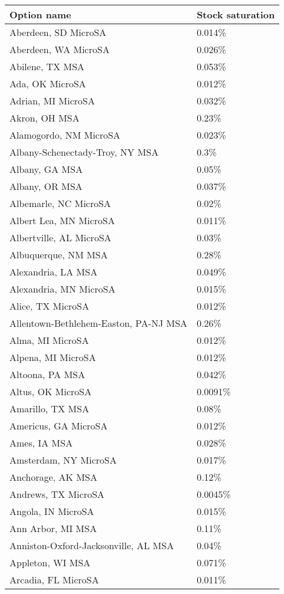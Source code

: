 \begin{longtable}[]{@{}ll@{}}
\toprule\noalign{}
Option name & Stock saturation \\
\midrule\noalign{}
\endhead
\bottomrule\noalign{}
\endlastfoot
Aberdeen, SD MicroSA & 0.014\% \\
Aberdeen, WA MicroSA & 0.026\% \\
Abilene, TX MSA & 0.053\% \\
Ada, OK MicroSA & 0.012\% \\
Adrian, MI MicroSA & 0.032\% \\
Akron, OH MSA & 0.23\% \\
Alamogordo, NM MicroSA & 0.023\% \\
Albany-Schenectady-Troy, NY MSA & 0.3\% \\
Albany, GA MSA & 0.05\% \\
Albany, OR MSA & 0.037\% \\
Albemarle, NC MicroSA & 0.02\% \\
Albert Lea, MN MicroSA & 0.011\% \\
Albertville, AL MicroSA & 0.03\% \\
Albuquerque, NM MSA & 0.28\% \\
Alexandria, LA MSA & 0.049\% \\
Alexandria, MN MicroSA & 0.015\% \\
Alice, TX MicroSA & 0.012\% \\
Allentown-Bethlehem-Easton, PA-NJ MSA & 0.26\% \\
Alma, MI MicroSA & 0.012\% \\
Alpena, MI MicroSA & 0.012\% \\
Altoona, PA MSA & 0.042\% \\
Altus, OK MicroSA & 0.0091\% \\
Amarillo, TX MSA & 0.08\% \\
Americus, GA MicroSA & 0.012\% \\
Ames, IA MSA & 0.028\% \\
Amsterdam, NY MicroSA & 0.017\% \\
Anchorage, AK MSA & 0.12\% \\
Andrews, TX MicroSA & 0.0045\% \\
Angola, IN MicroSA & 0.015\% \\
Ann Arbor, MI MSA & 0.11\% \\
Anniston-Oxford-Jacksonville, AL MSA & 0.04\% \\
Appleton, WI MSA & 0.071\% \\
Arcadia, FL MicroSA & 0.011\% \\

\end{longtable}
